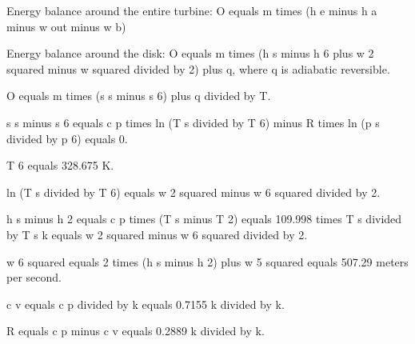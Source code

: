 Energy balance around the entire turbine:
O equals m times (h e minus h a minus w out minus w b)

Energy balance around the disk:
O equals m times (h s minus h 6 plus w 2 squared minus w squared divided by 2) plus q, where q is adiabatic reversible.

O equals m times (s s minus s 6) plus q divided by T.

s s minus s 6 equals c p times ln (T s divided by T 6) minus R times ln (p s divided by p 6) equals 0.

T 6 equals 328.675 K.

ln (T s divided by T 6) equals w 2 squared minus w 6 squared divided by 2.

h s minus h 2 equals c p times (T s minus T 2) equals 109.998 times T s divided by T s k equals w 2 squared minus w 6 squared divided by 2.

w 6 squared equals 2 times (h s minus h 2) plus w 5 squared equals 507.29 meters per second.

c v equals c p divided by k equals 0.7155 k divided by k.

R equals c p minus c v equals 0.2889 k divided by k.